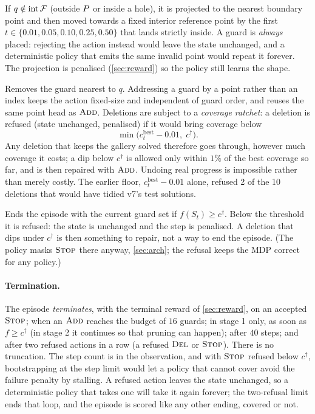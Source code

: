 \documentclass[11pt,a4paper]{article}
\begin{document}
\begin{description}[leftmargin=1.6em]
  \item[$\ADD$.] If $q\notin\operatorname{int}\mathcal{F}$ (outside $P$ or inside a hole), it is
        projected to the nearest boundary point and then moved towards a fixed interior
        reference point by the first $t\in\{0.01,0.05,0.10,0.25,0.50\}$ that lands strictly
        inside. A guard is \emph{always} placed: rejecting the action instead would leave the
        state unchanged, and a deterministic policy that emits the same invalid point would
        repeat it forever. The projection is penalised (\cref{sec:reward}) so the policy
        still learns the shape.
  \item[$\DEL$.] Removes the guard nearest to $q$. Addressing a guard by a point rather than
        an index keeps the action fixed-size and independent of guard order, and reuses the
        same point head as $\ADD$. Deletions are subject to a \emph{coverage ratchet}: a
        deletion is refused (state unchanged, penalised) if it would bring coverage below
        \[
          \min\bigl(c^{\mathrm{best}}_t - 0.01,\; c^\dagger\bigr).
        \]
        Any deletion that keeps the gallery solved therefore goes through, however much
        coverage it costs; a dip below $c^\dagger$ is allowed only within $1\%$ of the best
        coverage so far, and is then repaired with $\ADD$. Undoing real progress is
        impossible rather than merely costly. The earlier floor, $c^{\mathrm{best}}_t - 0.01$
        alone, refused 2 of the 10 deletions that would have tidied v7's test solutions.
  \item[$\STOP$.] Ends the episode with the current guard set if $f(S_t)\ge c^\dagger$.
        Below the threshold it is refused: the state is unchanged and the step is penalised.
        A deletion that dips under $c^\dagger$ is then something to repair, not a way to end
        the episode. (The policy masks $\STOP$ there anyway, \cref{sec:arch}; the refusal keeps
        the MDP correct for any policy.)
\end{description}

\paragraph{Termination.}
The episode \emph{terminates}, with the terminal reward of \cref{sec:reward}, on an accepted
$\STOP$; when an $\ADD$ reaches the budget of $16$ guards; in stage 1 only, as soon as
$f\ge c^\dagger$ (in stage 2 it continues so that pruning can happen); after $40$ steps; and
after two refused actions in a row (a refused $\DEL$ or $\STOP$). There is no truncation. The
step count is in the observation, and with $\STOP$ refused below $c^\dagger$, bootstrapping at
the step limit would let a policy that cannot cover avoid the failure penalty by stalling. A
refused action leaves the state unchanged, so a deterministic policy that takes one will take
it again forever; the two-refusal limit ends that loop, and the episode is scored like any
other ending, covered or not.
\end{document}
